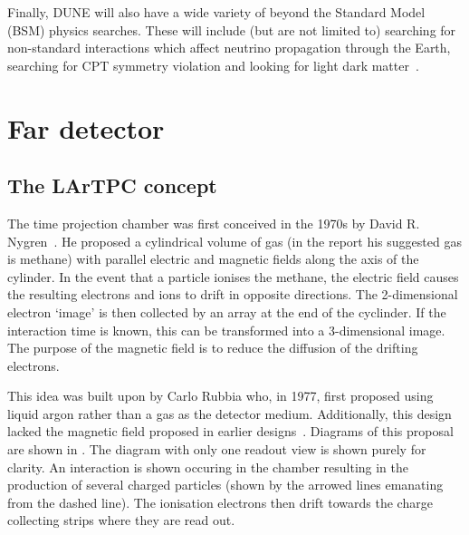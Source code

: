 Finally, DUNE will also have a wide variety of beyond the Standard Model (BSM) physics searches.
These will include (but are not limited to) searching for non-standard interactions which affect neutrino propagation through the Earth, searching for CPT symmetry violation and looking for light dark matter~\cite{duneBSM}.

\section{Far detector}
\label{sec:dune:fd}

\subsection{The LArTPC concept}
\label{sec:dune:fd:lartpc}
The time projection chamber was first conceived in the 1970s by David R. Nygren~\cite{nygrenProp}.
He proposed a cylindrical volume of gas (in the report his suggested gas is methane) with parallel electric and magnetic fields along the axis of the cylinder.
In the event that a particle ionises the methane, the electric field causes the resulting electrons and ions to drift in opposite directions.
The 2-dimensional electron `image' is then collected by an array at the end of the cyclinder.
If the interaction time is known, this can be transformed into a 3-dimensional image. 
The purpose of the magnetic field is to reduce the diffusion of the drifting electrons.

This idea was built upon by Carlo Rubbia who, in 1977, first proposed using liquid argon rather than a gas as the detector medium.
Additionally, this design lacked the magnetic field proposed in earlier designs~\cite{rubbiaProp}.
Diagrams of this proposal are shown in .
The diagram with only one readout view is shown purely for clarity.
An interaction is shown occuring in the chamber resulting in the production of several charged particles (shown by the arrowed lines emanating from the dashed line).
The ionisation electrons then drift towards the charge collecting strips where they are read out.
 

